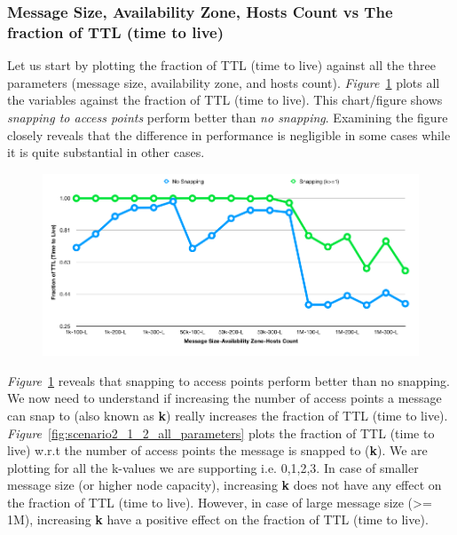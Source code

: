 {\subsubsection{Message Size, Availability Zone, Hosts Count vs The fraction of TTL (time to live)}
Let us start by plotting the fraction of TTL (time to live) against all the three parameters (message size, availability zone, and  hosts count). \emph{Figure}~\ref{fig:scenario2_1_all_parameters} plots all the variables against the fraction of TTL (time to live). This chart/figure shows \textit{snapping to access points} perform better than \textit{no snapping}. Examining the figure closely reveals that the difference in performance is negligible in some cases while it is quite substantial in other cases.
\begin{figure}[h!]
  \centering
  \includegraphics[scale=0.43]{./figures/scenario2_1_all_parameters}
  \label{fig:scenario2_1_all_parameters}
\end{figure}
\emph{Figure}~\ref{fig:scenario2_1_all_parameters} reveals that snapping to access points perform better than no snapping. We now need to understand if increasing the number of access points a message can snap to (also known as \textbf{k}) really increases the fraction of TTL (time to live). \newline \newline
\emph{Figure}~\ref{fig:scenario2_1_2_all_parameters} plots the fraction of TTL (time to live) w.r.t the number of access points the message is snapped to (\textbf{k}). We are plotting for all the k-values we are supporting i.e. 0,1,2,3. In case of smaller message size (or higher node capacity), increasing \textbf{k} does not have any effect on the fraction of TTL (time to live). However, in case of large message size (>= 1M), increasing \textbf{k} have a positive effect on the fraction of TTL (time to live).
}
